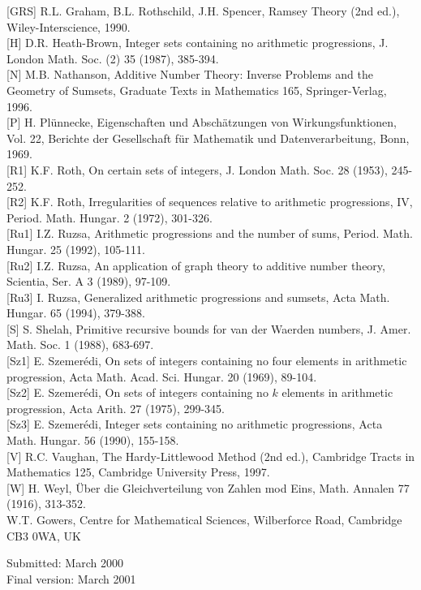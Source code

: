 \documentclass[10pt]{article}
\begin{document}
[GRS] R.L. Graham, B.L. Rothschild, J.H. Spencer, Ramsey Theory (2nd ed.), Wiley-Interscience, 1990.\\[0pt]
[H] D.R. Heath-Brown, Integer sets containing no arithmetic progressions, J. London Math. Soc. (2) 35 (1987), 385-394.\\[0pt]
[N] M.B. Nathanson, Additive Number Theory: Inverse Problems and the Geometry of Sumsets, Graduate Texts in Mathematics 165, Springer-Verlag, 1996.\\[0pt]
[P] H. Plünnecke, Eigenschaften und Abschätzungen von Wirkungsfunktionen, Vol. 22, Berichte der Gesellschaft für Mathematik und Datenverarbeitung, Bonn, 1969.\\[0pt]
[R1] K.F. Roth, On certain sets of integers, J. London Math. Soc. 28 (1953), 245-252.\\[0pt]
[R2] K.F. Roth, Irregularities of sequences relative to arithmetic progressions, IV, Period. Math. Hungar. 2 (1972), 301-326.\\[0pt]
[Ru1] I.Z. Ruzsa, Arithmetic progressions and the number of sums, Period. Math. Hungar. 25 (1992), 105-111.\\[0pt]
[Ru2] I.Z. Ruzsa, An application of graph theory to additive number theory, Scientia, Ser. A 3 (1989), 97-109.\\[0pt]
[Ru3] I. Ruzsa, Generalized arithmetic progressions and sumsets, Acta Math. Hungar. 65 (1994), 379-388.\\[0pt]
[S] S. Shelah, Primitive recursive bounds for van der Waerden numbers, J. Amer. Math. Soc. 1 (1988), 683-697.\\[0pt]
[Sz1] E. Szemerédi, On sets of integers containing no four elements in arithmetic progression, Acta Math. Acad. Sci. Hungar. 20 (1969), 89-104.\\[0pt]
[Sz2] E. Szemerédi, On sets of integers containing no $k$ elements in arithmetic progression, Acta Arith. 27 (1975), 299-345.\\[0pt]
[Sz3] E. Szemerédi, Integer sets containing no arithmetic progressions, Acta Math. Hungar. 56 (1990), 155-158.\\[0pt]
[V] R.C. Vaughan, The Hardy-Littlewood Method (2nd ed.), Cambridge Tracts in Mathematics 125, Cambridge University Press, 1997.\\[0pt]
[W] H. Weyl, Über die Gleichverteilung von Zahlen mod Eins, Math. Annalen 77 (1916), 313-352.\\
W.T. Gowers, Centre for Mathematical Sciences, Wilberforce Road, Cambridge CB3 0WA, UK

Submitted: March 2000\\
Final version: March 2001
\end{document}
